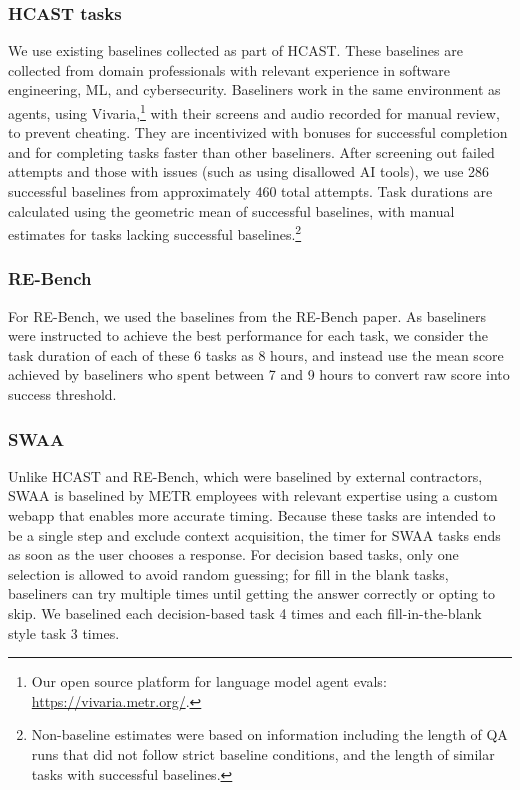 \documentclass{article}
\newcommand{\gabenchmark}{HCAST}
\newcommand{\numsuccessfulbaselines}{286}
\begin{document}
\subsubsection{\gabenchmark{} tasks}

We use existing baselines collected as part of \gabenchmark{}. These baselines are collected from domain professionals with relevant experience in software engineering, ML, and cybersecurity. Baseliners work in the same environment as agents, using Vivaria,\footnote{Our open source platform for language model agent evals: \url{https://vivaria.metr.org/}.} with their screens and audio recorded for manual review, to prevent cheating. They are incentivized with bonuses for successful completion and for completing tasks faster than other baseliners. After screening out failed attempts and those with issues (such as using disallowed AI tools), we use \numsuccessfulbaselines{} successful baselines from approximately 460 total attempts. Task durations are calculated using the geometric mean of successful baselines, with manual estimates for tasks lacking successful baselines.\footnote{Non-baseline estimates were based on information including the length of QA runs that did not follow strict baseline conditions, and the length of similar tasks with successful baselines.}

\subsubsection{RE-Bench}
For RE-Bench, we used the baselines from the RE-Bench paper. As baseliners were instructed to achieve the best performance for each task, we consider the task duration of each of these 6 tasks as 8 hours, and instead use the mean score achieved by baseliners who spent between 7 and 9 hours to convert raw score into success threshold. 

\subsubsection{SWAA}
Unlike \gabenchmark{} and RE-Bench, which were baselined by external contractors, SWAA is baselined by METR employees with relevant expertise using a custom webapp that enables more accurate timing. Because these tasks are intended to be a single step and exclude context acquisition, the timer for SWAA tasks ends as soon as the user chooses a response. For decision based tasks, only one selection is allowed to avoid random guessing; for fill in the blank tasks, baseliners can try multiple times until getting the answer correctly or opting to skip. We baselined each decision-based task 4 times and each fill-in-the-blank style task 3 times. 
\end{document}
